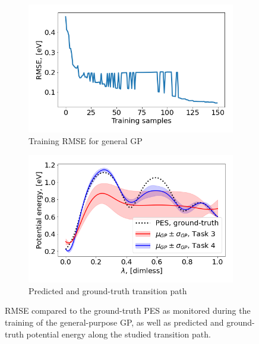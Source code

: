 \documentclass[11pt,a4paper]{article}
\begin{document}
\begin{figure}[ht]
    \centering
    \begin{subfigure}{.46\textwidth}
          \centering
          \includegraphics[width=1\textwidth]{figures/task4_train.png}
          \caption{Training RMSE for general GP}
          \label{fig:task4_rmse}
    \end{subfigure}%
    \begin{subfigure}{.46\textwidth}
          \centering
          \includegraphics[width=1\textwidth]{figures/task4_path.png}
          \caption{Predicted and ground-truth transition path}
    \label{fig:task4_transition}
    \end{subfigure}
    \caption{RMSE compared to the ground-truth PES as monitored during the training of the general-purpose GP, as well as predicted and ground-truth potential energy along the studied transition path.}
    \label{fig:task4}
\end{figure}
\end{document}
